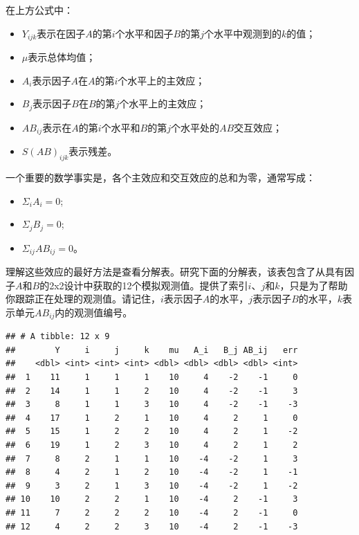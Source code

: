\documentclass[
]{book}
\providecommand{\tightlist}{%
  \setlength{\itemsep}{0pt}\setlength{\parskip}{0pt}}
\begin{document}
在上方公式中：

\begin{itemize}
\tightlist
\item
  \(Y_{ijk}\)表示在因子\(A\)的第\(i\)个水平和因子\(B\)的第\(j\)个水平中观测到的\(k\)的值；
\item
  \(\mu\)表示总体均值；
\item
  \(A_i\)表示因子\(A\)在\(A\)的第\(i\)个水平上的主效应；
\item
  \(B_j\)表示因子\(B\)在\(B\)的第\(j\)个水平上的主效应；
\item
  \(AB_{ij}\)表示在\(A\)的第\(i\)个水平和\(B\)的第\(j\)个水平处的\(AB\)交互效应；
\item
  \(S(AB)_{ijk}\)表示残差。
\end{itemize}

一个重要的数学事实是，各个主效应和交互效应的总和为零，通常写成：

\begin{itemize}
\tightlist
\item
  \(\Sigma_i A_i = 0\);
\item
  \(\Sigma_j B_j = 0\);
\item
  \(\Sigma_{ij} AB_{ij} = 0\)。
\end{itemize}

理解这些效应的最好方法是查看分解表。研究下面的分解表，该表包含了从具有因子\(A\)和\(B\)的2x2设计中获取的12个模拟观测值。提供了索引\(i\)、\(j\)和\(k\)，只是为了帮助你跟踪正在处理的观测值。请记住，\(i\)表示因子\(A\)的水平，\(j\)表示因子\(B\)的水平，\(k\)表示单元\(AB_{ij}\)内的观测值编号。

\begin{verbatim}
## # A tibble: 12 x 9
##        Y     i     j     k    mu   A_i   B_j AB_ij   err
##    <dbl> <int> <int> <int> <dbl> <dbl> <dbl> <dbl> <int>
##  1    11     1     1     1    10     4    -2    -1     0
##  2    14     1     1     2    10     4    -2    -1     3
##  3     8     1     1     3    10     4    -2    -1    -3
##  4    17     1     2     1    10     4     2     1     0
##  5    15     1     2     2    10     4     2     1    -2
##  6    19     1     2     3    10     4     2     1     2
##  7     8     2     1     1    10    -4    -2     1     3
##  8     4     2     1     2    10    -4    -2     1    -1
##  9     3     2     1     3    10    -4    -2     1    -2
## 10    10     2     2     1    10    -4     2    -1     3
## 11     7     2     2     2    10    -4     2    -1     0
## 12     4     2     2     3    10    -4     2    -1    -3
\end{verbatim}
\end{document}
